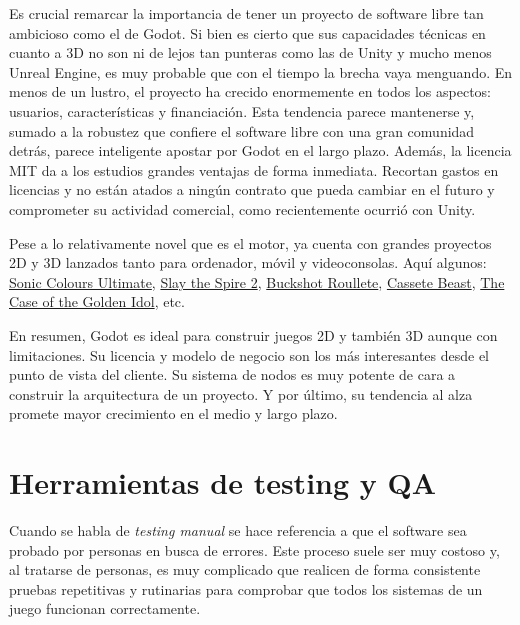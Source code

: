 Es crucial remarcar la importancia de tener un proyecto de software libre tan ambicioso como el de Godot. Si bien es cierto que sus capacidades técnicas en cuanto a 3D no son ni de lejos tan punteras como las de Unity y mucho menos Unreal Engine, es muy probable que con el tiempo la brecha vaya menguando. En menos de un lustro, el proyecto ha crecido enormemente en todos los aspectos: usuarios, características y financiación. Esta tendencia parece mantenerse y, sumado a la robustez que confiere el software libre con una gran comunidad detrás, parece inteligente apostar por Godot en el largo plazo. Además, la licencia MIT da a los estudios grandes ventajas de forma inmediata. Recortan gastos en licencias y no están atados a ningún contrato que pueda cambiar en el futuro y comprometer su actividad comercial, como recientemente ocurrió con Unity.

Pese a lo relativamente novel que es el motor, ya cuenta con grandes proyectos 2D y 3D lanzados tanto para ordenador, móvil y videoconsolas. Aquí algunos: \href{https://www.nintendo.com/es-es/Juegos/Juegos-de-Nintendo-Switch/Sonic-Colours-Ultimate-2014880.html?srsltid=AfmBOopP2Gm2S3Zo5fcoc3Ifz5E1b136K8O_6Y2vLMouJm2Zj5LI0aut}{Sonic Colours Ultimate}, \href{https://store.steampowered.com/app/2868840/Slay_the_Spire_2/}{Slay the Spire 2}, \href{https://store.steampowered.com/app/2835570/Buckshot_Roulette/}{Buckshot Roullete}, \href{https://store.steampowered.com/app/1321440/Cassette_Beasts/}{Cassete Beast}, \href{https://store.steampowered.com/app/1677770/The_Case_of_the_Golden_Idol/}{The Case of the Golden Idol}, etc.

En resumen, Godot es ideal para construir juegos 2D y también 3D aunque con limitaciones. Su licencia y modelo de negocio son los más interesantes desde el punto de vista del cliente. Su sistema de nodos es muy potente de cara a construir la arquitectura de un proyecto. Y por último, su tendencia al alza promete mayor crecimiento en el medio y largo plazo.

\section{Herramientas de testing y QA}

Cuando se habla de \textit{testing manual} se hace referencia a que el software sea probado por personas en busca de errores. Este proceso suele ser muy costoso y, al tratarse de personas, es muy complicado que realicen de forma consistente pruebas repetitivas y rutinarias para comprobar que todos los sistemas de un juego funcionan correctamente.

